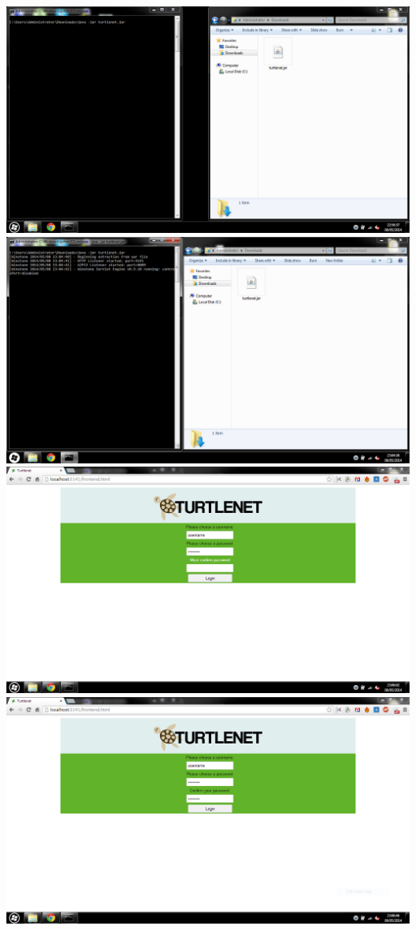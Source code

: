 \includegraphics[scale=0.2]{images/screenshots/1startprogram.png}
\includegraphics[scale=0.2]{images/screenshots/2running.png}
\includegraphics[scale=0.2]{images/screenshots/4login.png}
\includegraphics[scale=0.2]{images/screenshots/5loginagain.png}
